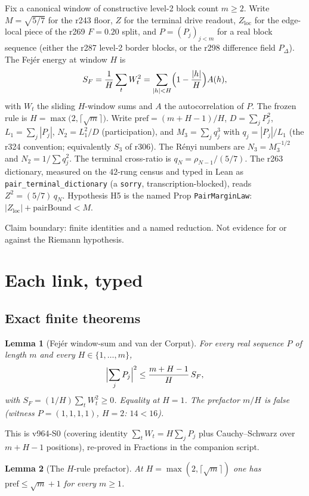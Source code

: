 \documentclass[11pt]{article}
\newtheorem{lemma}{Lemma}
\theoremstyle{remark}
\newcommand{\pref}{\mathrm{pref}}
\newcommand{\loc}{\mathrm{loc}}
\begin{document}
Fix a canonical window of constructive level-2 block count
$m\ge 2$.  Write $M=\sqrt{5/7}$ for the r243 floor, $Z$ for the
terminal drive readout, $Z_{\loc}$ for the edge-local piece of
the r269 $F=0.20$ split, and $P=(P_j)_{j<m}$ for a real block
sequence (either the r287 level-2 border blocks, or the r298
difference field $P_\Delta$).  The Fej\'er energy at window
$H$ is
\[
  S_F
  =\frac1H\sum_t W_t^2
  =\sum_{|h|<H}\Bigl(1-\frac{|h|}{H}\Bigr)A(h),
\]
with $W_t$ the sliding $H$-window sums and $A$ the
autocorrelation of $P$.  The frozen rule is
$H=\max\bigl(2,\lceil\sqrt{m}\rceil\bigr)$.  Write
$\pref=(m+H-1)/H$, $D=\sum_j P_j^2$, $L_1=\sum_j|P_j|$,
$N_2=L_1^2/D$ (participation), and $M_3=\sum_j q_j^3$ with
$q_j=|P_j|/L_1$ (the r324 convention; equivalently
$S_3$ of r306).  The R\'enyi numbers are $N_3=M_3^{-1/2}$ and
$N_2=1/\sum q_j^2$.  The terminal cross-ratio is
$q_N=\rho_{N-1}/(5/7)$.  The r263 dictionary, measured on the
$42$-rung census and typed in Lean as
\texttt{pair\_terminal\_dictionary} (a \texttt{sorry},
transcription-blocked), reads $Z^2=(5/7)\,q_N$.  Hypothesis H5
is the named Prop \texttt{PairMarginLaw}:
$|Z_{\loc}|+\mathrm{pairBound}<M$.

Claim boundary: finite identities and a named reduction.  Not
evidence for or against the Riemann hypothesis.

\section{Each link, typed}\label{sec:links}

\subsection*{Exact finite theorems}

\begin{lemma}[Fej\'er window-sum and van der Corput]\label{lem:vdc}
For every real sequence $P$ of length $m$ and every
$H\in\{1,\ldots,m\}$,
\[
  \Bigl|\sum_j P_j\Bigr|^2
  \le \frac{m+H-1}{H}\,S_F,
\]
with $S_F=(1/H)\sum_t W_t^2\ge 0$.  Equality at $H=1$.  The
prefactor $m/H$ is false (witness $P=(1,1,1,1)$, $H=2$:
$14<16$).
\end{lemma}

\noindent
This is v964-S0 (covering identity $\sum_t W_t=H\sum_j P_j$ plus
Cauchy--Schwarz over $m+H-1$ positions), re-proved in Fractions
in the companion script.

\begin{lemma}[The $H$-rule prefactor]\label{lem:pref}
At $H=\max(2,\lceil\sqrt{m}\rceil)$ one has
$\pref\le\sqrt{m}+1$ for every $m\ge 1$.
\end{lemma}
\end{document}
